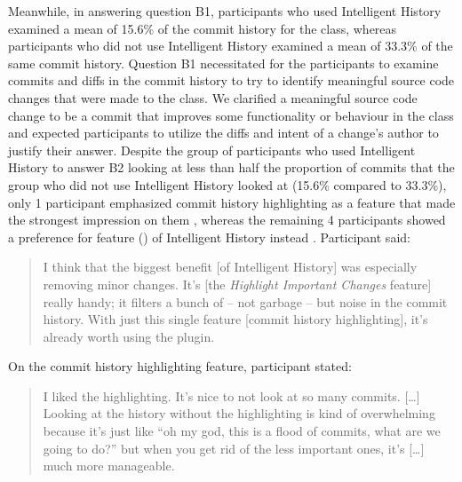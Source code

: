 Meanwhile, in answering question B1, participants who used Intelligent History examined a mean of 15.6\% of the commit history for the  class,
whereas participants who did not use Intelligent History examined a mean of 33.3\% of the same commit history.
Question B1 necessitated for the participants to examine commits and diffs in the  commit history to try to identify meaningful source code changes that were made to the class.
We clarified a meaningful source code change to be a commit that improves some functionality or behaviour in the class and expected participants to utilize the diffs and intent of a change's author to justify their answer.
Despite the group of participants who used Intelligent History to answer B2 looking at less than half the proportion of commits that the group who did not use Intelligent History looked at (15.6\% compared to 33.3\%),
only 1 participant emphasized commit history highlighting as a feature that made the strongest impression on them , 
whereas the remaining 4 participants showed a preference for feature () of Intelligent History instead .
Participant  said:

\begin{quote}
  I think that the biggest benefit [of Intelligent History] was especially removing minor changes. 
  It’s [the \textit{Highlight Important Changes} feature] really handy; it filters a bunch of -- not garbage -- but noise in the commit history. 
  With just this single feature [commit history highlighting], it’s already worth using the plugin.
\end{quote}

On the commit history highlighting feature, participant  stated:

\begin{quote}
  I liked the highlighting. 
  It’s nice to not look at so many commits. 
  [\dots] Looking at the history without the highlighting is kind of overwhelming because it’s just like ``oh my god, this is a flood of commits, 
  what are we going to do?'' 
  but when you get rid of the less important ones, it’s [\dots] much more manageable.
\end{quote}

